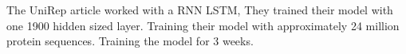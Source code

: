The UniRep article worked with a RNN LSTM, They trained their model with one 1900 hidden sized layer. Training their model with approximately 24 million protein sequences. Training the model for 3 weeks.